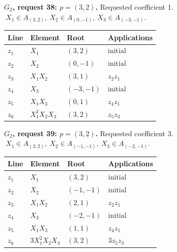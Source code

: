 \par\medskip\noindent\begin{minipage}{\textwidth}
\textbf{\(G_2\), request 38: \(p=(3,2)\).} Requested coefficient 1.
\(\ X_1\in A_{(3,2)},\ X_2\in A_{(0,-1)},\ X_3\in A_{(-3,-1)}.\)\par
\smallskip\centering\small\begin{tabular}{@{}llll@{}}\toprule
Line & Element & Root & Applications\\\midrule
\(z_{1}\) & \(X_1\) & \((3,2)\) & \(\text{initial}\) \\
\(z_{2}\) & \(X_2\) & \((0,-1)\) & \(\text{initial}\) \\
\(z_{3}\) & \(X_1X_2\) & \((3,1)\) & \(z_{2}z_{1}\) \\
\(z_{4}\) & \(X_3\) & \((-3,-1)\) & \(\text{initial}\) \\
\(z_{5}\) & \(X_1X_3\) & \((0,1)\) & \(z_{4}z_{1}\) \\
\(z_{6}\) & \(X_1^{2}X_2X_3\) & \((3,2)\) & \(z_{5}z_{3}\) \\
\bottomrule\end{tabular}\end{minipage}\par
\par\medskip\noindent\begin{minipage}{\textwidth}
\textbf{\(G_2\), request 39: \(p=(3,2)\).} Requested coefficient 3.
\(\ X_1\in A_{(3,2)},\ X_2\in A_{(-1,-1)},\ X_3\in A_{(-2,-1)}.\)\par
\smallskip\centering\small\begin{tabular}{@{}llll@{}}\toprule
Line & Element & Root & Applications\\\midrule
\(z_{1}\) & \(X_1\) & \((3,2)\) & \(\text{initial}\) \\
\(z_{2}\) & \(X_2\) & \((-1,-1)\) & \(\text{initial}\) \\
\(z_{3}\) & \(X_1X_2\) & \((2,1)\) & \(z_{2}z_{1}\) \\
\(z_{4}\) & \(X_3\) & \((-2,-1)\) & \(\text{initial}\) \\
\(z_{5}\) & \(X_1X_3\) & \((1,1)\) & \(z_{4}z_{1}\) \\
\(z_{6}\) & \(3X_1^{2}X_2X_3\) & \((3,2)\) & \(3z_{5}z_{3}\) \\
\bottomrule\end{tabular}\end{minipage}\par
